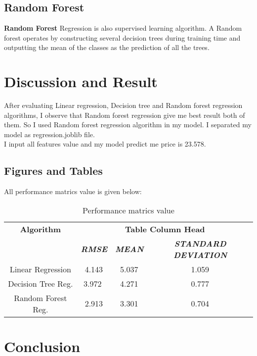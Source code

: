 \documentclass[conference]{IEEEtran}
\begin{document}
\subsection{Random Forest}
\textbf{Random Forest} Regression is also supervised learning algorithm. A Random forest operates by constructing several decision trees during training time and outputting the mean of the classes as the prediction of all the trees.

\section{Discussion and Result}
After evaluating Linear regression, Decision tree and Random forest regression algorithms, I observe that Random forest regression give me best result both of them. So I used Random forest regression algorithm in my model. I separated my model as regression.joblib file.\\

I input all features value and my model predict me price is 23.578. 
\subsection{Figures and Tables}
All performance matrics value is given below:
\begin{table}[htbp]
\caption{Performance matrics value}
\begin{center}
\begin{tabular}{|c|c|c|c|}
\hline
\textbf{Algorithm}&\multicolumn{3}{|c|}{\textbf{Table Column Head}} \\
\cline{2-4} 
\textbf{} & \textbf{\textit{RMSE}}& \textbf{\textit{MEAN}}& \textbf{\textit{STANDARD DEVIATION}} \\
\hline
Linear Regression& 4.143$^{\mathrm{}}$&5.037$^{\mathrm{}}$ & 1.059$^{\mathrm{}}$ \\
\hline
\hline
Decision Tree Reg.&3.972 $^{\mathrm{}}$&4.271$^{\mathrm{}}$ & 0.777$^{\mathrm{}}$ \\
\hline
\hline
Random Forest Reg. & 2.913$^{\mathrm{}}$&3.301$^{\mathrm{}}$ & 0.704$^{\mathrm{}}$ \\
\hline

\end{tabular}
\label{tab1}
\end{center}
\end{table}



\section{Conclusion}
\end{document}
